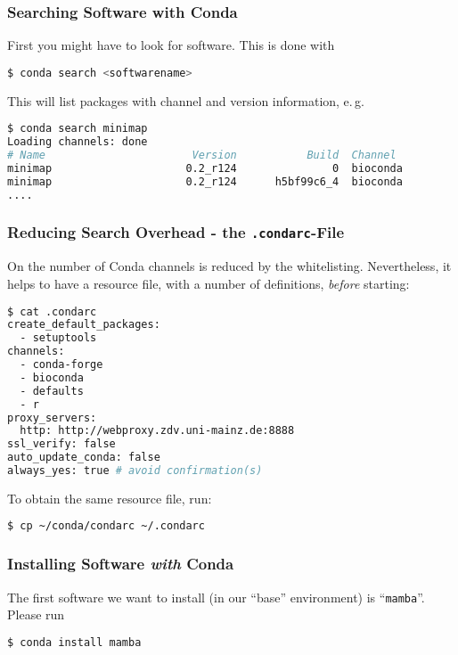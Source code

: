 \begin{frame}[fragile]
  \frametitle{Searching Software with Conda}
  First you might have to look for software. This is done with
  \begin{lstlisting}[language=Bash, style=Shell]
$ conda search <softwarename>
  \end{lstlisting}
  \pause
  \pause
  This will list packages with channel and version information, e.\,g.
  \begin{lstlisting}[language=Bash, style=Shell, basicstyle=\tiny]
$ conda search minimap
Loading channels: done
# Name                       Version           Build  Channel             
minimap                     0.2_r124               0  bioconda            
minimap                     0.2_r124      h5bf99c6_4  bioconda
....
  \end{lstlisting}
\end{frame}

\begin{frame}[fragile]
  \frametitle{Reducing Search Overhead - the \texttt{.condarc}-File}
  On \mogon{} the number of Conda channels is reduced by the whitelisting. Nevertheless, it helps to have a resource file, with a number of definitions, \emph{before} starting:
  \begin{lstlisting}[language=Bash, style=Shell, basicstyle=\tiny]
$ cat .condarc
create_default_packages:
  - setuptools
channels:
  - conda-forge
  - bioconda
  - defaults
  - r
proxy_servers:
  http: http://webproxy.zdv.uni-mainz.de:8888
ssl_verify: false
auto_update_conda: false
always_yes: true # avoid confirmation(s)
  \end{lstlisting}
  To obtain the same resource file, run:
  \begin{lstlisting}[language=Bash, style=Shell, basicstyle=\footnotesize]
$ cp ~/conda/condarc ~/.condarc
  \end{lstlisting}
\end{frame}

\begin{frame}[fragile]
  \frametitle{Installing Software \emph{with} Conda}
  The first software we want to install (in our ``base'' environment) is ``\texttt{mamba}''.  
  Please run
  \begin{lstlisting}[language=Bash, style=Shell]
$ conda install mamba
  \end{lstlisting}
\end{frame}

